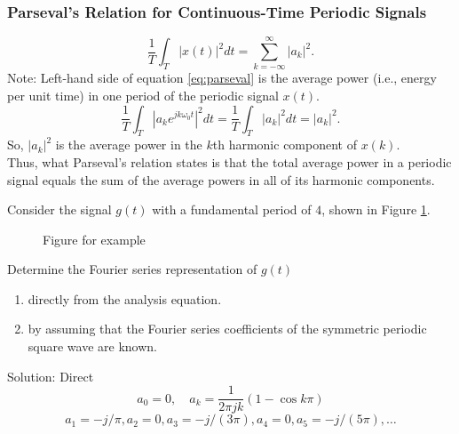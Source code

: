 \begin{frame}\frametitle{Parseval's Relation for Continuous-Time Periodic Signals}
    \begin{equation}\label{eq:parseval}
        \frac{1}{T}\int_{T} |x(t)|^2dt = \sum_{k=-\infty}^{\infty}|a_k|^2.
    \end{equation}
    \pause
    {
        \noindent Note: Left-hand side of equation \ref{eq:parseval} is the average power (i.e., energy per unit time) in one period of the periodic signal $x(t)$.\\

        \begin{equation}
            \frac{1}{T}\int_{T} \left| a_k e^{jk\omega_0 t}\right|^2dt = \frac{1}{T}\int_{T} \left| a_k \right|^2dt = |a_k|^2.
        \end{equation}
        So, $|a_k|^2$ is the average power in the $k$th harmonic component of $x(k)$.\\
        Thus, what Parseval's relation states is that the total average power in a periodic signal equals the sum of the average powers in all of its harmonic components.
    }
\end{frame}

\begin{frame}
    \begin{example}%
        Consider the signal $g(t)$ with a fundamental period of $4$, shown in Figure \ref{fi:example3p6}.
        \begin{figure}
          \centering
          
          \caption{Figure for example}\label{fi:example3p6}
        \end{figure}

        Determine the Fourier series representation of $g(t)$
        \begin{enumerate}
            \item directly from the analysis equation.
            \item by assuming that the Fourier series coefficients of the symmetric periodic square wave are known.
        \end{enumerate}
    \end{example}
\end{frame}



\begin{frame}{Solution: Direct}
{  
    \begin{equation*}
        a_0 = 0, \quad a_k = \frac{1}{2\pi jk}\left(1-\cos k\pi\right)
    \end{equation*}
    \begin{equation*}
        a_1 = -j/\pi, a_2 = 0, a_3 = -j/(3\pi), a_4 = 0, a_5 = -j/(5\pi), \dots
    \end{equation*}
}
\end{frame}



